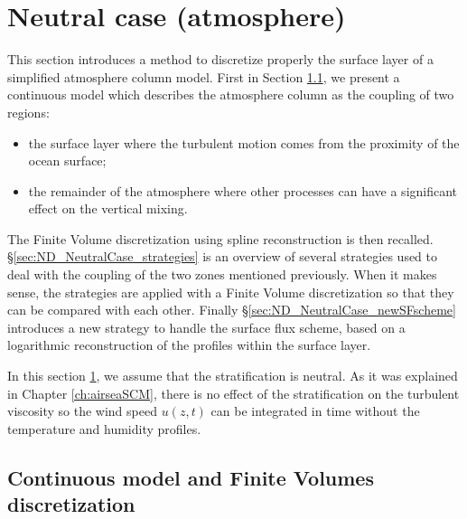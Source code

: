 \section{Neutral case (atmosphere)}
\label{sec:ND_NeutralCase}
This section introduces a method to discretize properly
the surface layer of a simplified atmosphere column model.
First in Section \ref{sec:ND_NeutralCase_continuousModel},
we present a continuous model which describes the atmosphere
column as the coupling of two regions:
\begin{itemize}
		\item the surface layer where the turbulent motion
			comes from the proximity of the ocean surface;
		\item the remainder of the atmosphere where other
			processes can have a significant effect
			on the vertical mixing.
\end{itemize}
The Finite Volume discretization using spline reconstruction
is then recalled.
\S \ref{sec:ND_NeutralCase_strategies}
is an overview of several strategies used to deal
with the coupling of the two zones mentioned previously.
When it makes sense, the strategies are applied with a
Finite Volume discretization so that they can be
compared with each other.
Finally \S \ref{sec:ND_NeutralCase_newSFscheme}
introduces a new strategy to handle the surface flux scheme,
based on a logarithmic reconstruction of the profiles
within the surface layer.
\par
In this section \ref{sec:ND_NeutralCase},
we assume that the stratification is neutral.
As it was explained in Chapter \ref{ch:airseaSCM},
there is no effect of the stratification on the turbulent viscosity
so the wind speed $u(z, t)$ can be integrated in time
without the temperature and humidity profiles.
\subsection{Continuous model and Finite Volumes discretization}
\label{sec:ND_NeutralCase_continuousModel}
